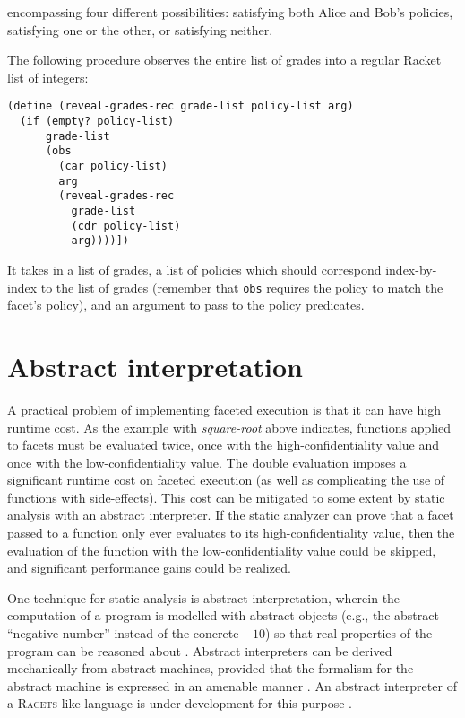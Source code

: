 \documentclass{article}
\begin{document}
encompassing four different possibilities: satisfying both Alice and Bob's policies, satisfying one or the other, or satisfying neither.

The following procedure observes the entire list of grades into a regular Racket list of integers:

\begin{lstlisting}
(define (reveal-grades-rec grade-list policy-list arg)
  (if (empty? policy-list)
      grade-list
      (obs
        (car policy-list)
        arg
        (reveal-grades-rec
          grade-list
          (cdr policy-list)
          arg))))])
\end{lstlisting}

It takes in a list of grades, a list of policies which should correspond index-by-index to the list of grades (remember that \texttt{obs} requires the policy to match the facet's policy), and an argument to pass to the policy predicates.

\section{Abstract interpretation}
A practical problem of implementing faceted execution is that it can have high runtime cost. As the example with \textit{square-root} above indicates, functions applied to facets must be evaluated twice, once with the high-confidentiality value and once with the low-confidentiality value. The double evaluation imposes a significant runtime cost on faceted execution (as well as complicating the use of functions with side-effects). This cost can be mitigated to some extent by static analysis with an abstract interpreter. If the static analyzer can prove that a facet passed to a function only ever evaluates to its high-confidentiality value, then the evaluation of the function with the low-confidentiality value could be skipped, and significant performance gains could be realized.

One technique for static analysis is abstract interpretation, wherein the computation of a program is modelled with abstract objects (e.g., the abstract ``negative number'' instead of the concrete $-10$) so that real properties of the program can be reasoned about \cite{ai-original}. Abstract interpreters can be derived mechanically from abstract machines, provided that the formalism for the abstract machine is expressed in an amenable manner \cite{aam}. An abstract interpreter of a \textsc{Racets}-like language is under development for this purpose \cite{abstract-inter}.
\end{document}
